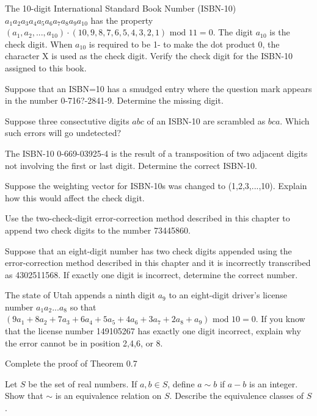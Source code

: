 \documentclass[11pt,largemargins]{homework}
\begin{document}
\question 
The 10-digit International Standard Book Number (ISBN-10)\\ $a_1a_2a_3a_4a_5a_6a_7a_8a_9a_{10}$ has the property \\
$(a_1, a_2, ..., a_{10})\cdot (10,9,8,7,6,5,4,3,2,1)\text{ mod }11=0$. The digit $a_{10}$ is the check digit. 
When $a_{10}$ is required to be 1- to make the dot product 0, the character X is used as the check digit.
Verify the check digit for the ISBN-10 assigned to this book.

\question 
Suppose that an ISBN=10 has a smudged entry where the question mark appears in the number 0-716?-2841-9.
Determine the missing digit.

\question 
Suppose three consectutive digits $abc$ of an ISBN-10 are scrambled as $bca$. Which such errors will go undetected?

\question 
The ISBN-10 0-669-03925-4 is the result of a transposition of two adjacent digits not involving the first or last digit. 
Determine the correct ISBN-10.

\question 
Suppose the weighting vector for ISBN-10s was changed to (1,2,3,...,10). Explain how this would affect the check digit.

\question 
Use the two-check-digit error-correction method described in this chapter to append two check digits to the 
number 73445860.

\question 
Suppose that an eight-digit number has two check digits appended using the error-correction method described in this chapter 
and it is incorrectly transcribed as 4302511568. If exactly one digit is incorrect, determine the correct number.

\question 
The state of Utah appends a ninth digit $a_9$ to an eight-digit driver's license number $a_1a_2...a_8$ so that 
$(9a_1+8a_2+7a_3+6a_4+5a_5+4a_6+3a_7+2a_8+a_9)\text{ mod } 10 =0$. If you know that the license number 149105267 has 
exactly one digit incorrect, explain why the error cannot be in position 2,4,6, or 8.

\question 
Complete the proof of Theorem 0.7

\question 
Let $S$ be the set of real numbers. If $a,b \in S$, define $a\sim b$ if $a-b$ is an integer. Show that $\sim$ is an 
equivalence relation on $S$. Describe the equivalence classes of $S$.
\end{document}
